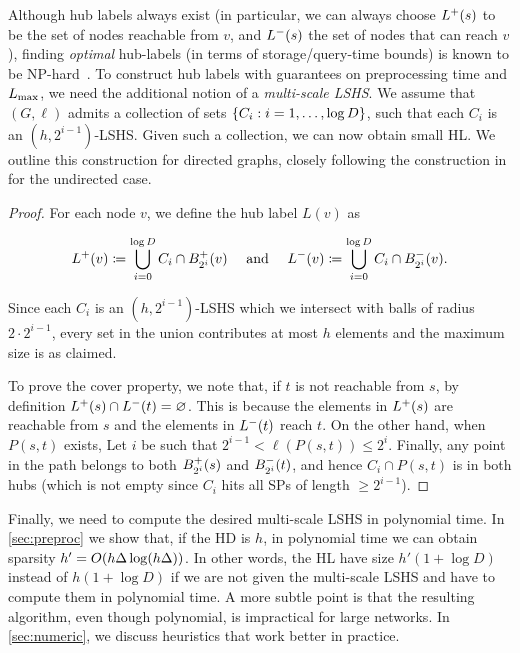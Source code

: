 Although hub labels always exist (in particular, we can always choose $\Lf(s)$ to be the set of nodes reachable from $v$, and $\Lb(s)$ the set of nodes that can reach $v$), finding \emph{optimal} hub-labels (in terms of storage/query-time bounds) is known to be NP-hard~\citep{babenko_hl_complexity}.
To construct hub labels with guarantees on preprocessing time and $\Lm$, we need the additional notion of a \emph{multi-scale LSHS}. 
We assume that $(G,\ell)$ admits a collection of sets $\crl*{C_i: i=1,\ldots,\log D}$, such that each $C_i$ is an $(h,2^{i-1})$-LSHS.
Given such a collection, we can now obtain small HL.
We outline this construction for directed graphs, closely following the construction in \citep[Theorem 5.1]{hd_journal} for the undirected case.
\begin{proof}
For each node $v$, we define the hub label $L(v)$ as

\begin{equation*}
\Lf(v)\defeq  \bigcup_{i=0}^{\log D}C_i\cap \Bf_{2^i}(v) \quad\text{ and }\quad
\Lb(v)\defeq \bigcup_{i=0}^{\log D}C_i\cap \Bb_{2^i}(v).
\end{equation*}

Since each $C_i$ is an $(h,2^{i-1})$-LSHS which we intersect with balls of radius $2\cdot 2^{i-1}$, every set in the union contributes at most $h$ elements and the maximum size is as claimed.

To prove the cover property, we note that, if $t$ is not reachable from $s$, by definition $\Lf(s)\cap\Lb(t)=\varnothing$.
This is because the elements in $\Lf(s)$ are reachable from $s$ and the elements in $\Lb(t)$ reach $t$.
On the other hand, when $P(s,t)$ exists, 
Let $i$ be such that $2^{i-1}<\ell(P(s,t))\leq 2^i$.
Finally, any point in the path belongs to both $\Bf_{2^i}(s)$ and $\Bb_{2^i}(t)$, and hence $C_i\cap P(s,t)$ is in both hubs (which is not empty since $C_i$ hits all SPs of length $\geq 2^{i-1}$).
\end{proof}


Finally, we need to compute the desired multi-scale LSHS in polynomial time.
In \cref{sec:preproc} we show that, if the HD is $h$, in polynomial time we can obtain sparsity $h'=\Or(h\Delta\log(h\Delta))$.
In other words, the HL have size $h'(1+\log D)$ instead of $h(1+\log D)$ if we are not given the multi-scale LSHS and have to compute them in polynomial time.
A more subtle point is that the resulting algorithm, even though polynomial, is impractical for large networks.
In \cref{sec:numeric}, we discuss heuristics that work better in practice.